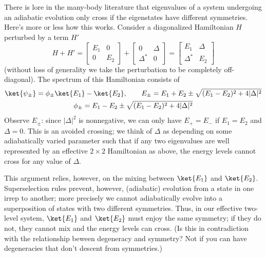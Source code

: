 \documentclass{report}
\begin{document}
There is lore in the many-body literature that eigenvalues of a system 
undergoing an adiabatic evolution only cross if the eigenstates have different 
symmetries. Here's more or less how this works. Consider a diagonalized 
Hamiltonian $ H $ perturbed by a term $ H' $
\begin{equation*}
H + H' = 
	\begin{bmatrix}
		E_1 & 0 \\ 0 & E_2 
	\end{bmatrix}
	+ \begin{bmatrix}
	0 & \Delta \\ \Delta^\ast & 0 
	\end{bmatrix}
	= \begin{bmatrix}
	E_1 & \Delta \\ \Delta^\ast & E_2
	\end{bmatrix}
\end{equation*}
(without loss of generality we take the perturbation to be completely off-diagonal). 
The spectrum of this Hamiltonian consists of 
\begin{gather*}
	\ket{\psi_{\pm}} = \phi_{\pm}\ket{E_1} - \ket{E_2},\qquad 
	E_\pm = E_1 + E_2 \pm \sqrt{(E_1 - E_2)^2 + 4 |\Delta|^2}\\ 
	\phi_{\pm} 
		= E_1 - E_2 \pm \sqrt{(E_1 - E_2)^2 + 4|\Delta|^2}
\end{gather*}
Observe $ E_{\pm} $: since $ |\Delta|^2 $ is nonnegative, we can only have 
$ E_+ = E_- $ if $ E_1 = E_2 $ and $ \Delta = 0 $. This is an avoided crossing; 
we think of $ \Delta $ as depending on some adiabatically varied parameter 
such that if any two eigenvalues are well represented by an effective $ 2\times
2 $ Hamiltonian as above, the energy levels cannot cross for any value of $
\Delta $.

This argument relies, however, on the mixing between $ \ket{E_1} $ and $
\ket{E_2} $. Superselection rules prevent, however, (adiabatic) evolution from a
state in one irrep to another; more precisely we cannot adiabatically evolve 
into a superposition of states with two different symmetries. Thus, in our 
effective two-level system, $ \ket{E_1} $ and $ \ket{E_2} $ must enjoy the 
same symmetry; if they do not, they cannot mix and the energy levels can cross. 
(Is this in contradiction with the relationship beween degeneracy and symmetry? 
Not if you can have degeneracies that don't descent from symmetries.)


\end{document}
